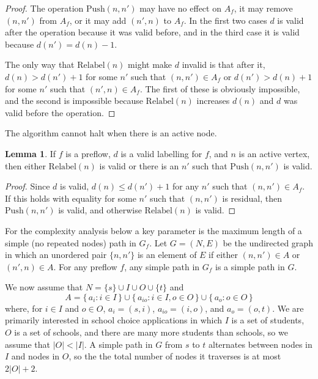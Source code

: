 \documentclass[12pt, A4paper]{article}
\theoremstyle{definition}
\newtheorem{lem}{Lemma}
\begin{document}
\begin{proof}
  The operation $\mathrm{Push}(n,n')$ may have no effect on $A_f$, it may remove $(n,n')$ from $A_f$, or it may add $(n',n)$ to $A_f$.  In the first two cases $d$ is valid after the operation because it was valid before, and in the third case it is valid because $d(n') = d(n) - 1$.
  
  The only way that $\mathrm{Relabel}(n)$ might make $d$ invalid is that after it, $d(n) > d(n') + 1$ for some $n'$ such that $(n,n') \in A_f$ or $d(n') > d(n) + 1$ for some $n'$ such that $(n',n) \in A_f$.  The first of these is obviously impossible, and the second is impossible because $\mathrm{Relabel}(n)$ increases $d(n)$ and $d$ was valid before the operation.  
\end{proof}

The algorithm cannot halt when there is an active node.

\begin{lem}
  If $f$ is a preflow, $d$ is a valid labelling for $f$, and $n$ is an active vertex, then either $\mathrm{Relabel}(n)$ is valid or there is an $n'$ such that $\mathrm{Push}(n,n')$ is valid.
\end{lem}

\begin{proof}
  Since $d$ is valid, $d(n) \le d(n') + 1$ for any $n'$ such that $(n,n') \in A_f$.   If this holds with equality for some $n'$ such that $(n,n')$ is residual, then $\mathrm{Push}(n,n')$ is valid, and otherwise $\mathrm{Relabel}(n)$ is valid.
\end{proof}

For the complexity analysis below a key parameter is the maximum length of a simple (no repeated nodes) path in $G_f$.  Let $G = (N,E)$ be the undirected graph in which an unordered pair $\{n,n'\}$ is an element of $E$ if either $(n,n') \in A$ or $(n',n) \in A$.  For any preflow $f$, any simple path in $G_f$ is a simple path in $G$.  

We now assume that $N = \{s\} \cup I \cup  O \cup \{t\}$ and 
$$A = \{\, a_i : i \in I \,\} \cup \{\, a_{io} : i \in I, o \in O \,\} \cup \{\, a_o : o \in O \,\}$$
where, for $i \in I$ and $o \in O$,  $a_i = (s,i)$, $a_{io} = (i,o)$, and $a_o = (o,t)$.  We are primarily interested in school choice applications in which $I$ is a set of students, $O$ is a set of schools, and there are many more students than schools, so we assume that $|O| < |I|$.  A simple path in $G$ from $s$ to $t$ alternates between nodes in $I$ and nodes in $O$, so the the total number of nodes it traverses is at most $2|O| + 2$.  
\end{document}
